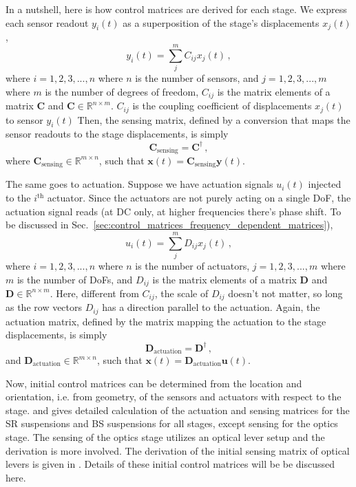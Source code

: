 In a nutshell, here is how control matrices are derived for each stage.
We express each sensor readout $y_i(t)$ as a superposition of the stage's displacements $x_j(t)$,
\begin{equation}
	y_i(t) = \sum_j^m C_{ij} x_j(t)\,,
\end{equation}
where $i=1,2,3,...,n$ where $n$ is the number of sensors, and $j=1,2,3,...,m$ where $m$ is the number of degrees of freedom, $C_{ij}$ is the matrix elements of a matrix $\mathbf{C}$ and $\mathbf{C}\in \mathbb{R}^{n\times m}$.
$C_{ij}$ is the coupling coefficient of displacements $x_j(t)$ to sensor  $y_i(t)$
Then, the sensing matrix, defined by a conversion that maps the sensor readouts to the stage displacements, is simply
\begin{equation}
	\mathbf{C}_{\mathrm{sensing}} = \mathbf{C}^{\dagger}\,,
\end{equation}
where $\mathbf{C}_\mathrm{sensing} \in \mathbb{R}^{m\times n}$, such that $\mathbf{x}(t) = \mathbf{C}_\mathrm{sensing}\mathbf{y}(t)$.

The same goes to actuation.
Suppose we have actuation signals $u_i(t)$ injected to the $i^\mathrm{th}$ actuator.
Since the actuators are not purely acting on a single DoF, the actuation signal reads (at DC only, at higher frequencies there's phase shift. To be discussed in Sec.~\ref{sec:control_matrices_frequency_dependent_matrices}),
\begin{equation}
	u_i(t) = \sum_j^m D_{ij} x_j(t)\,,
\end{equation}
where $i=1,2,3,...,n$ where $n$ is the number of actuators, $j=1,2,3,...,m$ where $m$ is the number of DoFs, and $D_{ij}$ is the matrix elements of a matrix $\mathbf{D}$ and $\mathbf{D}\in \mathbb{R}^{n\times m}$.
Here, different from $C_{ij}$, the scale of $D_{ij}$ doesn't not matter, so long as the row vectors $D_{ij}$ has a direction parallel to the actuation.
Again, the actuation matrix, defined by the matrix mapping the actuation to the stage displacements, is simply
\begin{equation}
	\mathbf{D}_\mathrm{actuation} = \mathbf{D}^{\dagger}\,,
\end{equation}
and $\mathbf{D}_\mathrm{actuation}\in\mathbb{R}^{m\times n}$, such that $\mathbf{x}(t) = \mathbf{D}_\mathrm{actuation}\mathbf{u}(t)$.

Now, initial control matrices can be determined from the location and orientation, i.e. from geometry, of the sensors and actuators with respect to the stage.
\cite{sr_suspension_diagonalization} and \cite{bs_suspension_diagonalization} gives detailed calculation of the actuation and sensing matrices for the SR suspensions and BS suspensions for all stages, except sensing for the optics stage.
The sensing of the optics stage utilizes an optical lever setup and the derivation is more involved.
The derivation of the initial sensing matrix of optical levers is given in \cite{sensing_matrices_oplev}.
Details of these initial control matrices will be be discussed here.


